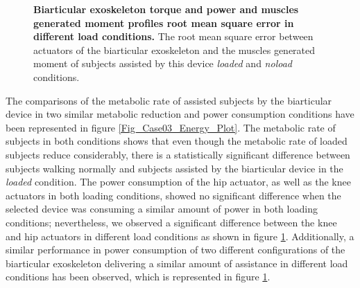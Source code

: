 \documentclass[10pt,letterpaper]{article}
\begin{document}
\begin{figure}[ht!]
	\centering
	\hfil
	\vspace{1mm}
	\caption{\small{\textbf{Biarticular exoskeleton torque and power and muscles generated moment profiles root mean square error in different load conditions.} The root mean square error between actuators of the biarticular exoskeleton and the muscles generated moment of subjects assisted by this device {\it loaded} and {\it noload} conditions.}}
	\label{Fig_Case03_RMSE}
\end{figure}
The comparisons of the metabolic rate of assisted subjects by the biarticular device in two similar metabolic reduction and power consumption conditions have been represented in figure \ref{Fig_Case03_Energy_Plot}. The metabolic rate of subjects in both conditions shows that even though the metabolic rate of loaded subjects reduce considerably, there is a statistically significant difference between subjects walking normally and subjects assisted by the biarticular device in the {\it loaded} condition. The power consumption of the hip actuator, as well as the knee actuators in both loading conditions, showed no significant difference when the selected device was consuming a similar amount of power in both loading conditions; nevertheless, we observed a significant difference between the knee and hip actuators in different load conditions as shown in figure \ref{Fig_Case03_RMSE}. Additionally, a similar performance in power consumption of  two different configurations of the biarticular exoskeleton delivering a similar amount of assistance in different load conditions has been observed, which is represented in figure \ref{Fig_Case03_RMSE}.\\
\end{document}
